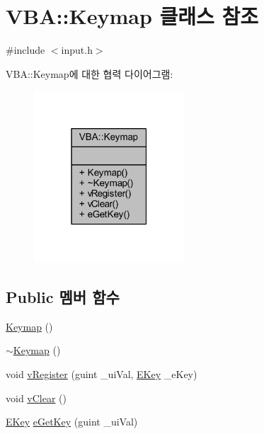\hypertarget{class_v_b_a_1_1_keymap}{}\section{V\+BA\+:\+:Keymap 클래스 참조}
\label{class_v_b_a_1_1_keymap}


{\ttfamily \#include $<$input.\+h$>$}



V\+BA\+:\+:Keymap에 대한 협력 다이어그램\+:\nopagebreak
\begin{figure}[H]
\begin{center}
\leavevmode
\includegraphics[width=159pt]{class_v_b_a_1_1_keymap__coll__graph}
\end{center}
\end{figure}
\subsection*{Public 멤버 함수}
\begin{DoxyCompactItemize}
\item 
\mbox{\hyperlink{class_v_b_a_1_1_keymap_a4bfe26cd2bbd32743c62fb73892e256c}{Keymap}} ()
\item 
\mbox{\hyperlink{class_v_b_a_1_1_keymap_affd3b003c7a026ce1ceea6581d042d1d}{$\sim$\+Keymap}} ()
\item 
void \mbox{\hyperlink{class_v_b_a_1_1_keymap_a016d13905248b39677f9be0382616d79}{v\+Register}} (guint \+\_\+ui\+Val, \mbox{\hyperlink{class_v_b_a_a5839ea5408735bd8ce070c4c245750cc}{E\+Key}} \+\_\+e\+Key)
\item 
void \mbox{\hyperlink{class_v_b_a_1_1_keymap_a3ab4ca7dcf977067ab7ce631fe6aab57}{v\+Clear}} ()
\item 
\mbox{\hyperlink{class_v_b_a_a5839ea5408735bd8ce070c4c245750cc}{E\+Key}} \mbox{\hyperlink{class_v_b_a_1_1_keymap_a486ec30d582382b892c6e81588baa03c}{e\+Get\+Key}} (guint \+\_\+ui\+Val)
\end{DoxyCompactItemize}


